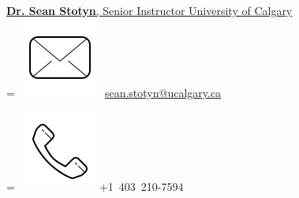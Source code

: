 \begin{minipage}[t]{0.27\textwidth}
{}
\parbox{\wd0}{}\endgroup
\\
\sectionsep
\href{https://contacts.ucalgary.ca/info/phas/profiles/1-6248004} {\textbf{Dr. Sean Stotyn}, Senior Instructor University of Calgary} 
\\
\begingroup
{}=\hbox{
\includegraphics[scale=0.1,trim={0 1cm 0cm 0cm}]{icons/main/mail.png}\hspace{0.1cm}  	\href{mailto:sean.stotyn@ucalgary.ca}{sean.stotyn@ucalgary.ca}
}
\parbox{\wd0}{}
\endgroup
\begingroup
{}=\hbox{
\includegraphics[scale=0.1,trim={0 1.25cm -0.4cm 0cm}]{icons/main/phone.png}\hspace{0.1cm}+1 403 210-7594
}
\parbox{\wd0}{}\endgroup
\\

\end{minipage} 

